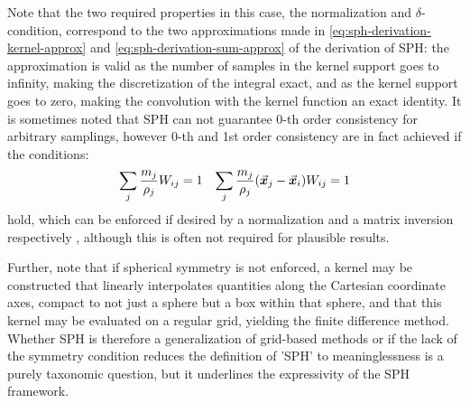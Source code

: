 Note that the two required properties in this case, the normalization and $\delta$-condition, correspond to the two approximations made in \autoref{eq:sph-derivation-kernel-approx} and \autoref{eq:sph-derivation-sum-approx} of the derivation of SPH: the approximation is valid as the number of samples in the kernel support goes to infinity, making the discretization of the integral exact, and as the kernel support goes to zero, making the convolution with the kernel function an exact identity\autocite*{sph-lucy-77}. It is sometimes noted that SPH can not guarantee 0-th order consistency for arbitrary samplings, however 0-th and 1st order consistency are in fact achieved if the conditions\autocite{tutorial}:
\begin{align}\label{eq:sph-consistency-conditions}
  \sum_j \frac{m_j}{\rho_j} W_{ij}=1 &  & \sum_j \frac{m_j}{\rho_j} (\vec{\bm{x}}_j-\vec{\bm{x}}_i)W_{ij}=1
\end{align}
hold, which can be enforced if desired by a normalization and a matrix inversion respectively \autocite*{price-2012}, although this is often not required for plausible results.

Further, note that if spherical symmetry is not enforced, a kernel may be constructed that linearly interpolates quantities along the Cartesian coordinate axes, compact to not just a sphere but a box within that sphere, and that this kernel may be evaluated on a regular grid, yielding the finite difference method. Whether SPH is therefore a generalization of grid-based methods or if the lack of the symmetry condition reduces the definition of 'SPH' to meaninglessness is a purely taxonomic question, but it underlines the expressivity of the SPH framework.

\horizontalspacer

